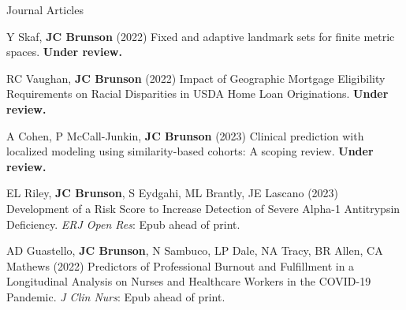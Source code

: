 \documentclass[10pt,a4paper]{article}
\begin{document}

\vspace{.25cm}
{\sc Journal Articles}
\begin{enumerate}[label={[\arabic*]},labelindent=1cm,nolistsep]
\item
Y Skaf, {\bfseries JC Brunson} (2022) Fixed and adaptive landmark sets for finite metric spaces. {\bfseries Under review.}
\item
RC Vaughan, {\bfseries JC Brunson} (2022) Impact of Geographic Mortgage Eligibility Requirements on Racial Disparities in USDA Home Loan Originations. {\bfseries Under review.}
\item
A Cohen, P McCall-Junkin, {\bfseries JC Brunson} (2023) Clinical prediction with localized modeling using similarity-based cohorts: A scoping review. {\bfseries Under review.}
\item
EL Riley, {\bfseries JC Brunson}, S Eydgahi, ML Brantly, JE Lascano (2023) Development of a Risk Score to Increase Detection of Severe Alpha-1 Antitrypsin Deficiency. {\itshape ERJ Open Res}: Epub ahead of print.
\item
AD Guastello, {\bfseries JC Brunson}, N Sambuco, LP Dale, NA Tracy, BR Allen, CA Mathews (2022) Predictors of Professional Burnout and Fulfillment in a Longitudinal Analysis on Nurses and Healthcare Workers in the COVID-19 Pandemic. {\itshape J Clin Nurs}: Epub ahead of print.

\end{enumerate}
\end{document}
